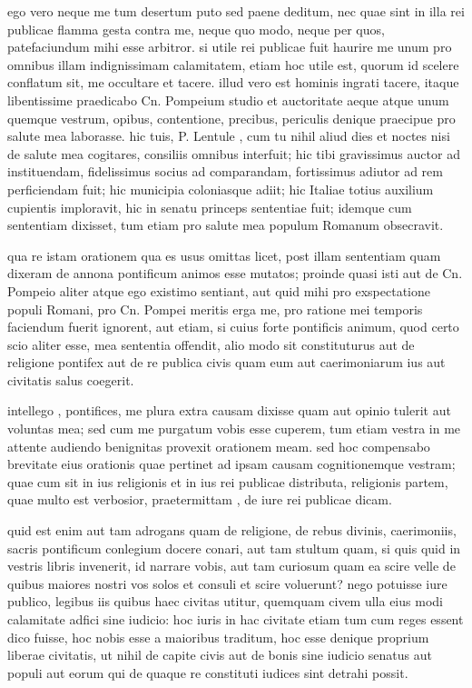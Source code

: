  ego vero neque me tum desertum puto sed paene deditum, nec quae sint in illa rei publicae flamma gesta contra me, neque quo modo, neque per quos, patefaciundum mihi esse arbitror. si utile rei publicae fuit haurire me unum pro omnibus illam indignissimam calamitatem, etiam hoc utile est, quorum id scelere conflatum sit, me occultare et tacere. illud vero est hominis ingrati tacere, itaque libentissime praedicabo Cn. Pompeium studio et auctoritate aeque atque unum quemque vestrum, opibus, contentione, precibus, periculis denique praecipue pro salute mea laborasse. hic tuis, P. Lentule , cum tu nihil aliud dies et noctes nisi de salute mea cogitares, consiliis omnibus interfuit; hic tibi gravissimus auctor ad instituendam, fidelissimus socius ad comparandam, fortissimus adiutor ad rem perficiendam fuit; hic municipia coloniasque adiit; hic Italiae totius auxilium cupientis imploravit, hic in senatu princeps sententiae fuit; idemque cum sententiam dixisset, tum etiam pro salute mea populum Romanum obsecravit.

 qua re istam orationem qua es usus omittas licet, post illam sententiam quam dixeram de annona pontificum animos esse mutatos; proinde quasi isti aut de Cn. Pompeio aliter atque ego existimo sentiant, aut quid mihi pro exspectatione populi Romani, pro Cn. Pompei meritis erga me, pro ratione mei temporis faciendum fuerit ignorent, aut etiam, si cuius forte pontificis animum, quod certo scio aliter esse, mea sententia offendit, alio modo sit constituturus aut de religione pontifex aut de re publica civis quam eum aut caerimoniarum ius aut civitatis salus coegerit.

 intellego , pontifices, me plura extra causam dixisse quam aut opinio tulerit aut voluntas mea; sed cum me purgatum vobis esse cuperem, tum etiam vestra in me attente audiendo benignitas provexit orationem meam. sed hoc compensabo brevitate eius orationis quae pertinet ad ipsam causam cognitionemque vestram; quae cum sit in ius religionis et in ius rei publicae distributa, religionis partem, quae multo est verbosior, praetermittam , de iure rei publicae dicam.

 quid est enim aut tam adrogans quam de religione, de rebus divinis, caerimoniis, sacris pontificum conlegium docere conari, aut tam stultum quam, si quis quid in vestris libris invenerit, id narrare vobis, aut tam curiosum quam ea scire velle de quibus maiores nostri vos solos et consuli et scire voluerunt? nego potuisse iure publico, legibus iis quibus haec civitas utitur, quemquam civem ulla eius modi calamitate adfici sine iudicio: hoc iuris in hac civitate etiam tum cum reges essent dico fuisse, hoc nobis esse a maioribus traditum, hoc esse denique proprium liberae civitatis, ut nihil de capite civis aut de bonis sine iudicio senatus aut populi aut eorum qui de quaque re constituti iudices sint detrahi possit.

